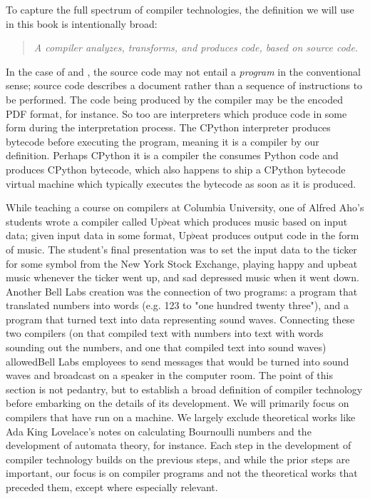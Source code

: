 \vspace{0.5em}

To capture the full spectrum of compiler technologies, the 
definition we will use in this book is intentionally broad:
\begin{quotation}
\textit{A compiler analyzes, transforms, and produces code, based on source code.}
\label{def:compiler}
\end{quotation}

In the case of \tex and \metafont, the source code may not entail a 
\textit{program} in the conventional sense; \tex source code describes a 
document rather than a sequence of instructions to be performed. The code being 
produced by the compiler may be the encoded PDF format, for instance. So too are 
interpreters which produce code in some form during the interpretation 
process. The CPython interpreter produces \gls{bytecode} before executing the 
program, meaning it is a compiler by our definition. Perhaps CPython it is a 
compiler the consumes Python code and produces CPython bytecode, which also 
happens to ship a CPython bytecode virtual machine which typically executes the 
bytecode as soon as it is produced. 

While teaching a course on compilers at 
Columbia University, one of Alfred Aho's students wrote a compiler called 
Up$\flat$eat which produces music based on input data; given input data in some 
format, Up$\flat$eat produces output code in the form of 
music\cite{aho_oral_history_2022}. The student's final presentation was to set 
the input data to the ticker for some symbol from the New York Stock Exchange, 
playing happy and upbeat music whenever the ticker went up, and sad depressed 
music when it went down. Another Bell Labs creation was the connection of two 
programs: a program that translated numbers into words (e.g. 123 to "one 
hundred twenty three"), and a program that turned text into data representing 
sound waves. Connecting these two compilers (on that compiled text with numbers 
into text with words sounding out the numbers, and one that compiled text into 
sound waves) allowedBell Labs employees to send messages that would be turned 
into sound waves and broadcast on a speaker in the computer room. The point of 
this section is not pedantry, but to establish a broad definition of compiler 
technology before embarking on the details of its development. We will primarily 
focus on compilers that have run on a machine. We largely exclude theoretical 
works like Ada King Lovelace's notes on calculating Bournoulli numbers and the 
development of automata theory, for instance. Each step in the development of 
compiler technology builds on the previous steps, and while the prior steps are 
important, our focus is on compiler programs and not the theoretical works that 
preceded them, except where especially relevant.
